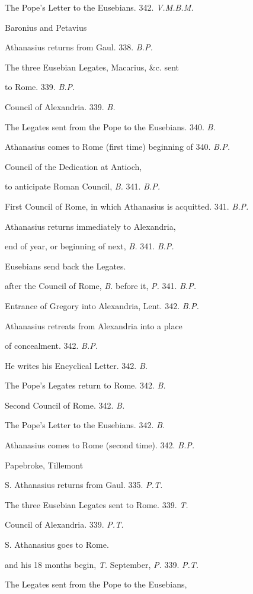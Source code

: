 The Pope's Letter to the
Eusebians.
342. \emph{V.M.B.M.}

Baronius
and Petavius

Athanasius returns from
Gaul.
338. \emph{B.P.}

The three Eusebian Legates,
Macarius, \&c. sent

to Rome.
339.
\emph{B.P.}

Council of Alexandria.
339. \emph{B.}

The Legates sent from the
Pope to the Eusebians.
340. \emph{B.}

Athanasius comes to
Rome (first time) beginning of
340. \emph{B.P.}

Council of the Dedication at
Antioch,

to anticipate Roman Council, \emph{B.}
341. \emph{B.P.}

First Council of Rome, in
which Athanasius is acquitted.
341. \emph{B.P.}

Athanasius returns
immediately to Alexandria, 

end of year, or beginning of next, \emph{B.}
341. \emph{B.P.}

Eusebians send back the
Legates.

after
the Council of Rome, \emph{B.} before it, \emph{P.}
341. \emph{B.P.}

Entrance of Gregory into
Alexandria, Lent.
342. \emph{B.P.}

Athanasius retreats from
Alexandria into a place

of concealment.
342. \emph{B.P.}

He writes his Encyclical
Letter.
342. \emph{B.}

The Pope's Legates return to
Rome.
342. \emph{B.}

Second Council of Rome.
342. \emph{B.}

The Pope's Letter to the
Eusebians.
342. \emph{B.}

Athanasius comes to Rome
(second time).
342. \emph{B.P.}

Papebroke,
Tillemont

S. Athanasius returns from
Gaul.
335. \emph{P.T.}

The three Eusebian Legates
sent to Rome.
339. \emph{T.}

Council of Alexandria.
339. \emph{P.T.}

S. Athanasius goes to Rome.

and
his 18 months begin, \emph{T.} September, \emph{P.}
339. \emph{P.T.}

The Legates sent from the
Pope to the Eusebians, 

